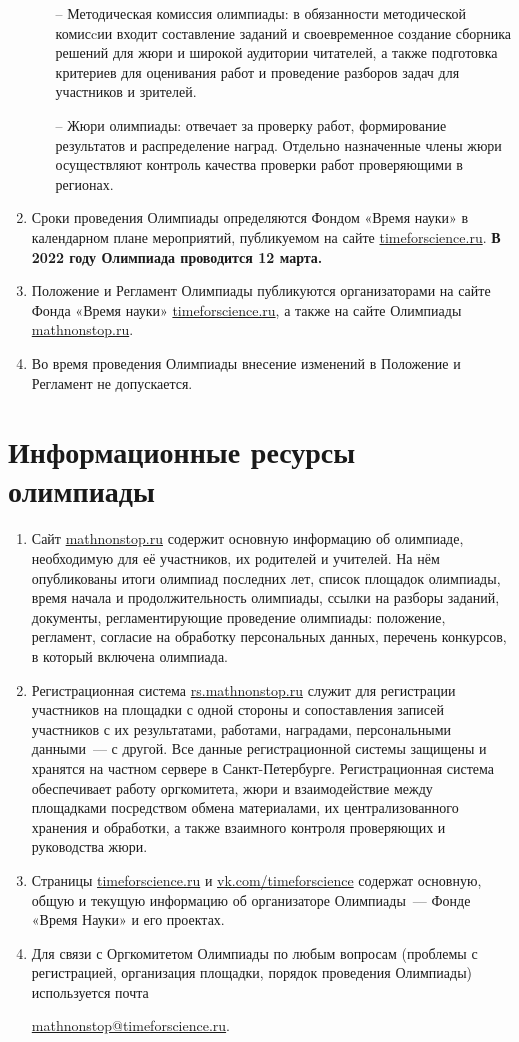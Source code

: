 \documentclass[a4paper,12pt]{article}
\newcommand{\surl}[1]{{\small\url{#1}}}
\begin{document}
\begin{enumerate}
\begin{enumerate}
	   \item[–] Методическая комиссия олимпиады: в обязанности методической комисcии входит составление заданий и своевременное создание сборника решений для жюри и широкой аудитории читателей, а также подготовка критериев для оценивания работ и проведение разборов задач для участников и зрителей.
	   \item[–] Жюри олимпиады: отвечает за проверку работ, формирование результатов и распределение наград. Отдельно назначенные члены жюри осуществляют контроль качества проверки работ проверяющими в регионах.
   \end{enumerate}
	\item Сроки проведения Олимпиады определяются Фондом «Время науки» в календарном плане мероприятий, публикуемом на сайте \surl{timeforscience.ru}. {\bf В 2022 году Олимпиада проводится 12 марта.}
	\item Положение и Регламент Олимпиады публикуются организаторами на сайте Фонда «Время науки» \surl{timeforscience.ru}, а также на сайте Олимпиады \surl{mathnonstop.ru}.
	\item Во время проведения Олимпиады внесение изменений в Положение и Регламент не допускается.
\end{enumerate}

\section{Информационные ресурсы олимпиады}

\begin{enumerate}
	\item Сайт \surl{mathnonstop.ru} содержит основную информацию об олимпиаде, необходимую для её участников, их родителей и учителей. На нём опубликованы итоги олимпиад последних лет, список площадок олимпиады, время начала и продолжительность олимпиады, ссылки на разборы заданий, документы, регламентирующие проведение олимпиады: положение, регламент, согласие на обработку персональных данных, перечень конкурсов, в который включена олимпиада.
	\item Регистрационная система \surl{rs.mathnonstop.ru} служит для регистрации участников на площадки с одной стороны и сопоставления записей участников с их результатами, работами, наградами, персональными данными~— с другой. Все данные регистрационной системы защищены и хранятся на частном сервере в Санкт-Петербурге. Регистрационная система обеспечивает работу оргкомитета, жюри и взаимодействие между площадками посредством обмена материалами, их централизованного хранения и обработки, а также взаимного контроля проверяющих и руководства жюри.
	\item Страницы \surl{timeforscience.ru} и \surl{vk.com/timeforscience} содержат основную, общую и текущую информацию об организаторе Олимпиады~— Фонде «Время Науки» и его проектах.
	\item Для связи с Оргкомитетом Олимпиады по любым вопросам (проблемы с регистрацией, организация площадки, порядок проведения Олимпиады) используется почта \\
	\centerline{\surl{mathnonstop@timeforscience.ru}.}
\end{enumerate}
\end{document}
